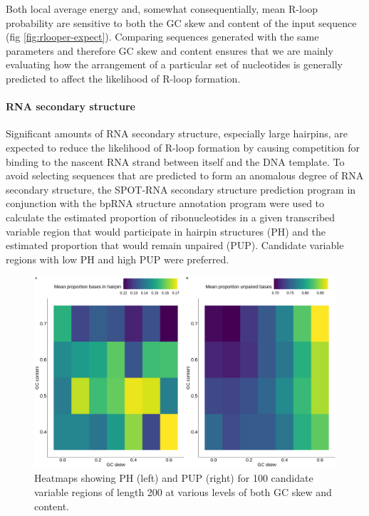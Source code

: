 \documentclass[11pt]{article}
\begin{document}
Both local average energy and, somewhat consequentially, mean R-loop probability are sensitive to both the GC skew and content of the input sequence (fig \ref{fig:rlooper-expect}). Comparing sequences generated with the same parameters and therefore GC skew and content ensures that we are mainly evaluating how the arrangement of a particular set of nucleotides is generally predicted to affect the likelihood of R-loop formation.


\paragraph{RNA secondary structure}

Significant amounts of RNA secondary structure, especially large hairpins, are expected to reduce the likelihood of R-loop formation by causing competition for binding to the nascent RNA strand between itself and the DNA template. To avoid selecting sequences that are predicted to form an anomalous degree of RNA secondary structure, the SPOT-RNA secondary structure prediction program in conjunction with the bpRNA structure annotation program \cite{Singh2019, Danaee2018} were used to calculate the estimated proportion of ribonucleotides in a given transcribed variable region that would participate in hairpin structures (PH) and the estimated proportion that would remain unpaired (PUP). Candidate variable regions with low PH and high PUP were preferred.


\begin{figure}[H]
	\includegraphics[width=14cm]{images/plots/rna_secondary_structure_temp.png}
	\centering
	\caption{Heatmaps showing PH (left) and PUP (right) for 100 candidate variable regions of length 200 at various levels of both GC skew and content.}
	\label{fig:rna_secondary_structure}
\end{figure}
\end{document}
